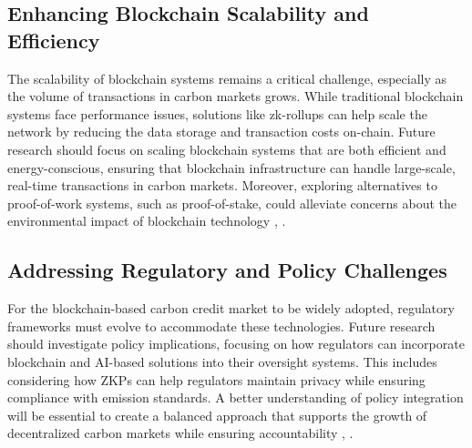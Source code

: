 \documentclass[preprint,12pt]{elsarticle}
\begin{document}
\subsection{Enhancing Blockchain Scalability and Efficiency}
The scalability of blockchain systems remains a critical challenge, especially as the volume of transactions in carbon markets grows. While traditional blockchain systems face performance issues, solutions like zk-rollups can help scale the network by reducing the data storage and transaction costs on-chain. Future research should focus on scaling blockchain systems that are both efficient and energy-conscious, ensuring that blockchain infrastructure can handle large-scale, real-time transactions in carbon markets. Moreover, exploring alternatives to proof-of-work systems, such as proof-of-stake, could alleviate concerns about the environmental impact of blockchain technology \citep{bunz2021rollups}, \citep{buterin2013ethereum}.
\subsection{Addressing Regulatory and Policy Challenges}
For the blockchain-based carbon credit market to be widely adopted, regulatory frameworks must evolve to accommodate these technologies. Future research should investigate policy implications, focusing on how regulators can incorporate blockchain and AI-based solutions into their oversight systems. This includes considering how ZKPs can help regulators maintain privacy while ensuring compliance with emission standards. A better understanding of policy integration will be essential to create a balanced approach that supports the growth of decentralized carbon markets while ensuring accountability \citep{rejeb2021blockchain}, \citep{gracia2021developing}.
\end{document}
